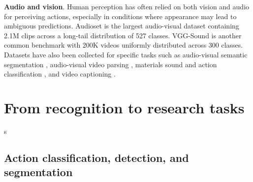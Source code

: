 \documentclass[smallextended,twocolumn,natbib]{svjour3}
\begin{document}
\noindent
\textbf{Audio and vision}. Human perception has often relied on both vision and audio for perceiving actions, especially in conditions where appearance may lead to ambiguous predictions. Audioset \citep{gemmeke2017audio} is the largest audio-visual dataset containing 2.1M clips across a long-tail distribution of 527 classes. VGG-Sound \citep{chen2020vggsound} is another common benchmark with 200K videos uniformly distributed across 300 classes. Datasets have also been collected for specific tasks such as audio-visual semantic segmentation \citep{zhou2022audio}, audio-visual video parsing \citep{tian2020unified}, materials sound and action classification \citep{huh2023epic,owens2016visually}, and video captioning \citep{monfort2021spoken}.




\section{From recognition to research tasks}
\label{sec:recognition}

\citep{wang2023learning}s

\subsection{Action classification, detection, and segmentation}

\citep{albanie2020end}
\citep{stergiou2023leaping}
\end{document}
